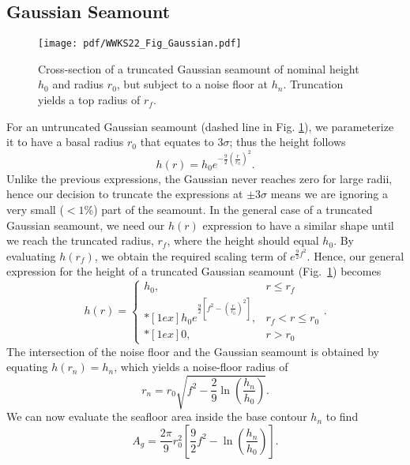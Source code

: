\subsection{Gaussian Seamount}

\begin{figure}
\centering
\texttt{[image: pdf/WWKS22\_Fig\_Gaussian.pdf]}
\caption{Cross-section of a truncated Gaussian seamount of nominal height $h_0$ and radius
$r_0$, but subject to a noise floor at $h_n$.  Truncation yields a top radius of $r_f$.}
\label{WWKS22_Fig_Gaussian}
\end{figure}

For an untruncated Gaussian seamount (dashed line in Fig. \ref{WWKS22_Fig_Gaussian}), we parameterize it to have
a basal radius $r_0$ that equates to $3\sigma$; thus the height follows
\begin{equation*}
h(r) = h_0 e^{-\frac{9}{2} \left (\frac{r}{r_0} \right)^2}.
\end{equation*}
Unlike the previous expressions, the Gaussian never reaches zero for large radii, hence our decision to
truncate the expressions at $\pm3\sigma$ means we are ignoring a very small ($<1$\%) part of the seamount.
In the general case of a truncated Gaussian seamount, we need our $h(r)$ expression to have a similar
shape until we reach the truncated radius, $r_f$, where the height should equal $h_0$.
By evaluating $h(r_f)$, we obtain the required scaling term of $e^{\frac{9}{2}f^2}$.
Hence, our general expression for the height of a truncated Gaussian seamount (Fig.~\ref{WWKS22_Fig_Gaussian}) becomes
\begin{equation*}
h(r) = \left \{ \begin{array}{cl}
	h_0, &	r \leq r_f \\*[1ex]
	\displaystyle h_0 e^{\frac{9}{2} \left [ f^2 - \left (\frac{r}{r_0} \right )^2 \right ]}, & r_f < r \leq r_0 \\*[1ex]
	0, & r > r_0
\end{array} \right..
\end{equation*}
The intersection of the noise floor and the Gaussian seamount is obtained by equating $h(r_n) = h_n$,
which yields a noise-floor radius of
\begin{equation*}
r_n = r_0 \sqrt{f^2 - \frac{2}{9} \ln{\left (\frac{h_n}{h_0} \right )}}.
\end{equation*}
We can now evaluate the seafloor area inside the base contour $h_n$ to find
\begin{equation}
A_g = \frac{2\pi}{9} r_0^2 \left [ \frac{9}{2}f^2  - \ln{\left( \frac{h_n}{h_0} \right )} \right ].
\end{equation}

